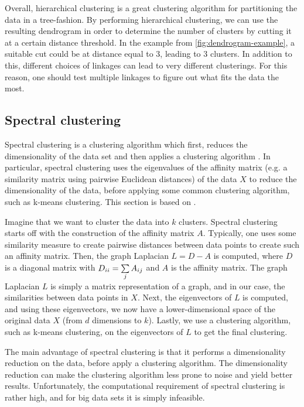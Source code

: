 Overall, hierarchical clustering is a great clustering algorithm for partitioning the data in a tree-fashion. By performing hierarchical clustering, we can use the resulting dendrogram in order to determine the number of clusters by cutting it at a certain distance threshold. In the example from \cref{fig:dendrogram-example}, a suitable cut could be at distance equal to 3, leading to 3 clusters. In addition to this, different choices of linkages can lead to very different clusterings. For this reason, one should test multiple linkages to figure out what fits the data the most.

\subsection{Spectral clustering}
\label{sec:spectral-clustering}
Spectral clustering is a clustering algorithm which first, reduces the dimensionality of the data set and then applies a clustering algorithm \cite{Andrew2002}. In particular, spectral clustering uses the eigenvalues of the affinity matrix (e.g. a similarity matrix using pairwise Euclidean distances) of the data $X$ to reduce the dimensionality of the data, before applying some common clustering algorithm, such as k-means clustering. This section is based on \cite{Andrew2002}.

Imagine that we want to cluster the data into $k$ clusters. Spectral clustering starts off with the construction of the affinity matrix $A$. Typically, one uses some similarity measure to create pairwise distances between data points to create such an affinity matrix. Then, the graph Laplacian $L = D - A$ is computed, where $D$ is a diagonal matrix with $D_{ii} = \sum\limits_{j}^{} A_{ij}$ and $A$ is the affinity matrix. The graph Laplacian $L$ is simply a matrix representation of a graph, and in our case, the similarities between data points in $X$. Next, the eigenvectors of $L$ is computed, and using these eigenvectors, we now have a lower-dimensional space of the original data $X$ (from $d$ dimensions to $k$). Lastly, we use a clustering algorithm, such as k-means clustering, on the eigenvectors of $L$ to get the final clustering.

The main advantage of spectral clustering is that it performs a dimensionality reduction on the data, before apply a clustering algorithm. The dimensionality reduction can make the clustering algorithm less prone to noise and yield better results. Unfortunately, the computational requirement of spectral clustering is rather high, and for big data sets it is simply infeasible.

